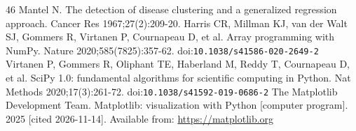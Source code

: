 \begin{thebibliography}{46}
 Mantel N. The detection of disease clustering and a generalized regression approach. Cancer Res 1967;27(2):209-20.
 Harris CR, Millman KJ, van der Walt SJ, Gommers R, Virtanen P, Cournapeau D, et al. Array programming with NumPy. Nature 2020;585(7825):357-62. doi:\nolinkurl{10.1038/s41586-020-2649-2}
 Virtanen P, Gommers R, Oliphant TE, Haberland M, Reddy T, Cournapeau D, et al. SciPy 1.0: fundamental algorithms for scientific computing in Python. Nat Methods 2020;17(3):261-72. doi:\nolinkurl{10.1038/s41592-019-0686-2}
 The Matplotlib Development Team. Matplotlib: visualization with Python [computer program]. 2025 [cited 2026-11-14]. Available from: \url{https://matplotlib.org}
\end{thebibliography}
